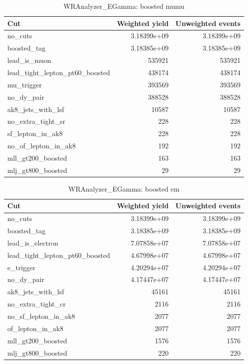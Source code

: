 \documentclass{article}
\begin{document}
\begin{table}[htbp]
\centering
\caption{WRAnalyzer\_EGamma: boosted mumu}
\begin{tabular}{lrr}
\hline
Cut & Weighted yield & Unweighted events \\
\hline
no\_cuts & 3.18399e+09 & 3.18399e+09 \\
boosted\_tag & 3.18385e+09 & 3.18385e+09 \\
lead\_is\_muon & 535921 & 535921 \\
lead\_tight\_lepton\_pt60\_boosted & 438174 & 438174 \\
mu\_trigger & 393569 & 393569 \\
no\_dy\_pair & 388528 & 388528 \\
ak8\_jets\_with\_lsf & 10587 & 10587 \\
no\_extra\_tight\_sr & 228 & 228 \\
sf\_lepton\_in\_ak8 & 228 & 228 \\
no\_of\_lepton\_in\_ak8 & 192 & 192 \\
mll\_gt200\_boosted & 163 & 163 \\
mlj\_gt800\_boosted & 29 & 29 \\
\hline
\end{tabular}
\end{table}

\begin{table}[htbp]
\centering
\caption{WRAnalyzer\_EGamma: boosted em}
\begin{tabular}{lrr}
\hline
Cut & Weighted yield & Unweighted events \\
\hline
no\_cuts & 3.18399e+09 & 3.18399e+09 \\
boosted\_tag & 3.18385e+09 & 3.18385e+09 \\
lead\_is\_electron & 7.07858e+07 & 7.07858e+07 \\
lead\_tight\_lepton\_pt60\_boosted & 4.67998e+07 & 4.67998e+07 \\
e\_trigger & 4.20294e+07 & 4.20294e+07 \\
no\_dy\_pair & 4.17447e+07 & 4.17447e+07 \\
ak8\_jets\_with\_lsf & 45161 & 45161 \\
no\_extra\_tight\_cr & 2116 & 2116 \\
no\_sf\_lepton\_in\_ak8 & 2077 & 2077 \\
of\_lepton\_in\_ak8 & 2077 & 2077 \\
mll\_gt200\_boosted & 1576 & 1576 \\
mlj\_gt800\_boosted & 220 & 220 \\
\hline
\end{tabular}
\end{table}
\end{document}
